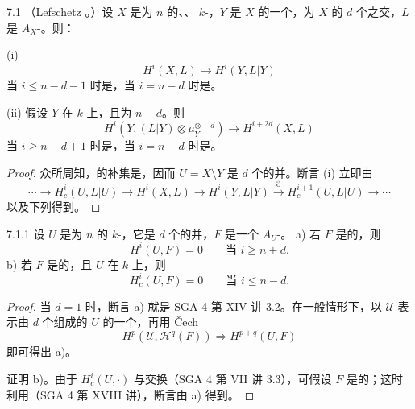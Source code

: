 \begin{SGAresult}{}{7.1}
（Lefschetz 。）设 $X$ 是为 $n$ 的、、 $k$-，$Y$ 是 $X$ 的一个，为 $X$ 的 $d$ 个之交，$L$ 是 $A_X$-。则：

(i) 
\[
 H^i(X,L)\longrightarrow H^i(Y,L|Y)
\]
当 $i\le n-d-1$ 时是，当 $i=n-d$ 时是。

(ii) 假设 $Y$ 在 $k$ 上，且为 $n-d$。则 
\[
 H^i(Y,(L|Y)\otimes\mu_Y^{\otimes-d})\longrightarrow H^{i+2d}(X,L)
\]
当 $i\ge n-d+1$ 时是，当 $i=n-d$ 时是。
\end{SGAresult}
\begin{proof}
众所周知，的补集是，因而 $U=X\setminus Y$ 是 $d$ 个的并。断言 (i) 立即由
\[
 \cdots\longrightarrow H_c^i(U,L|U)\longrightarrow H^i(X,L)
 \longrightarrow H^i(Y,L|Y)\xrightarrow{\partial}H_c^{i+1}(U,L|U)\longrightarrow\cdots
\]
以及下列得到。
\end{proof}
\begin{SGAresult}{}{7.1.1}
设 $U$ 是为 $n$ 的 $k$-，它是 $d$ 个的并，$F$ 是一个 $A_U$-。
a) 若 $F$ 是的，则
\[
 H^i(U,F)=0\qquad\text{当 }i\ge n+d.
\]
b) 若 $F$ 是的，且 $U$ 在 $k$ 上，则
\[
 H_c^i(U,F)=0\qquad\text{当 }i\le n-d.
\]
\end{SGAresult}
\begin{proof}
当 $d=1$ 时，断言 a) 就是 SGA 4 第 XIV 讲 3.2。在一般情形下，以 $\mathscr U$ 表示由 $d$ 个组成的 $U$ 的一个，再用 Čech 
\[
 H^p(\mathscr U,\mathscr H^q(F))\Longrightarrow H^{p+q}(U,F)
\]
即可得出 a)。

证明 b)。由于 $H_c^i(U,\cdot)$ 与交换（SGA 4 第 VII 讲 3.3），可假设 $F$ 是的；这时利用（SGA 4 第 XVIII 讲），断言由 a) 得到。
\end{proof}
